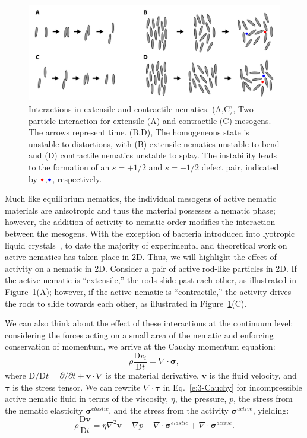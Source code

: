 \begin{figure}
  \centering
  \includegraphics{figures/C3/Ch3-Figs_ActiveInteraction.png}
  \caption{Interactions in extensile and contractile nematics.
  (A,C), Two-particle interaction for extensile (A) and contractile (C) mesogens.
  The arrows represent time.
  (B,D), The homogeneous state is unstable to distortions, with (B) extensile nematics unstable to bend and (D) contractile nematics unstable to splay.
  The instability leads to the formation of an $s = + 1/2$ and $s = -1/2$ defect pair, indicated by ${\color{red} \bullet}$,${\color{blue} \bullet}$, respectively.}\label{f:3-ActiveInteraction}
\end{figure}

Much like equilibrium nematics, the individual mesogens of active nematic materials are anisotropic and thus the material possesses a nematic phase; however, the addition of activity to nematic order modifies the interaction between the mesogens.
With the exception of bacteria introduced into lyotropic liquid crystals~\cite{RN86}, to date the majority of experimental and theoretical work on active nematics has taken place in 2D.
Thus, we will highlight the effect of activity on a nematic in 2D.
Consider a pair of active rod-like particles in 2D.
If the active nematic is ``extensile,'' the rods slide past each other, as illustrated in Figure~\ref{f:3-ActiveInteraction}(A); however, if the active nematic is ``contractile,'' the activity drives the rods to slide towards each other, as illustrated in Figure~\ref{f:3-ActiveInteraction}(C).

We can also think about the effect of these interactions at the continuum level; considering the forces acting on a small area of the nematic and enforcing conservation of momentum, we arrive at the Cauchy momentum equation:
\begin{equation}
  \rho \frac{\textrm{D} v_i}{\textrm{D}t } = \nabla \cdot \bm{\sigma},\label{e:3-Cauchy}
\end{equation}
where $\textrm{D}/\textrm{D}t = \partial/\partial t + \mathbf{v} \cdot \nabla$ is the material derivative, $\mathbf{v}$ is the fluid velocity, and $\bm{\tau}$ is the stress tensor.
We can rewrite $\nabla \cdot \bm{\tau}$ in Eq.~\ref{e:3-Cauchy} for incompressible active nematic fluid in terms of the viscosity, $\eta$, the pressure, $p$, the stress from the nematic elasticity $\bm{\sigma}^{elastic}$, and the stress from the activity $\bm{\sigma}^{active}$, yielding:
\begin{equation}
  \rho \frac{\textrm{D} \mathbf{v}}{\textrm{D}t } = \eta \nabla^2 \mathbf{v} - \nabla p + \nabla \cdot \bm{\sigma}^{elastic} + \nabla \cdot \bm{\sigma}^{active}.\label{e:3-NavierStokes}
\end{equation}

